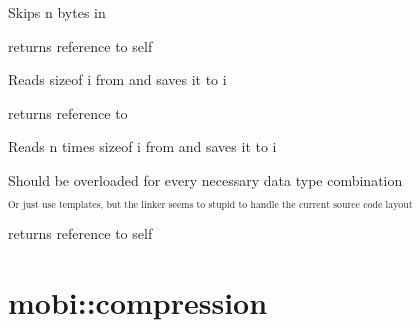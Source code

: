 \documentclass[letterpaper,10pt,english]{sphinxmanual}
\begin{document}

\begin{fulllineitems}
\label{header_handler:header_handler::skip__unsigned-i}
Skips n bytes in {\hyperref[header_handler:header_handler::file__std::ifstreamP]{}}

returns reference to self

\end{fulllineitems}


\begin{fulllineitems}
\label{header_handler:header_handler::read__typeR}
Reads sizeof i from {\hyperref[header_handler:header_handler::file__std::ifstreamP]{}} and saves it to i

returns reference to {\hyperref[header_handler:header_handler]{}}

\end{fulllineitems}


\begin{fulllineitems}
\label{header_handler:header_handler::read__typeR.unsigned-i}
Reads n times sizeof i from {\hyperref[header_handler:header_handler::file__std::ifstreamP]{}} and saves it to i

Should be overloaded for every necessary data type combination

$_{\text{Or just use templates, but the linker seems to stupid to handle the current
source code layout}}$

returns reference to self

\end{fulllineitems}



\section{mobi::compression}
\label{compression:mobi-compression}\label{compression::doc}
\end{document}
